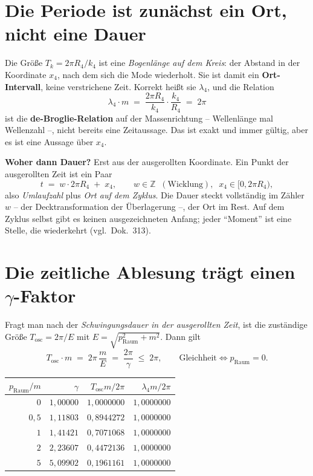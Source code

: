 \section{Die Periode ist zunächst ein Ort, nicht eine Dauer}

Die Größe $T_k = 2\pi R_4/k_4$ ist eine \emph{Bogenlänge auf dem
Kreis}: der Abstand in der Koordinate $x_4$, nach dem sich die Mode
wiederholt. Sie ist damit ein \textbf{Ort-Intervall}, keine
verstrichene Zeit. Korrekt heißt sie $\lambda_4$, und die Relation
\begin{equation}
  \lambda_4 \cdot m \;=\; \frac{2\pi R_4}{k_4}\cdot\frac{k_4}{R_4}
  \;=\; 2\pi
\end{equation}
ist die \textbf{de-Broglie-Relation} auf der Massenrichtung --
Wellenlänge mal Wellenzahl --, nicht bereits eine Zeitaussage.
Das ist exakt und immer gültig, aber es ist eine Aussage über
$x_4$.

\textbf{Woher dann Dauer?} Erst aus der ausgerollten Koordinate.
Ein Punkt der ausgerollten Zeit ist ein Paar
\begin{equation}
  t \;=\; w\cdot 2\pi R_4 \;+\; x_4,
  \qquad w \in \mathbb{Z} \;\;(\text{Wicklung}),\;\;
  x_4 \in [0, 2\pi R_4),
\end{equation}
also \emph{Umlaufzahl} plus \emph{Ort auf dem Zyklus}. Die Dauer
steckt vollständig im Zähler $w$ -- der Decktransformation der
Überlagerung --, der Ort im Rest. Auf dem Zyklus selbst gibt es
keinen ausgezeichneten Anfang; jeder \enquote{Moment} ist eine
Stelle, die wiederkehrt (vgl.\ Dok.~313).

\section{Die zeitliche Ablesung trägt einen \texorpdfstring{$\gamma$}{gamma}-Faktor}

Fragt man nach der \emph{Schwingungsdauer in der ausgerollten
Zeit}, ist die zuständige Größe $T_\text{osc} = 2\pi/E$ mit
$E = \sqrt{p_\text{Raum}^2 + m^2}$. Dann gilt
\begin{equation}
  T_\text{osc}\cdot m \;=\; 2\pi\,\frac{m}{E}
  \;=\; \frac{2\pi}{\gamma}
  \;\le\; 2\pi,
  \qquad\text{Gleichheit} \iff p_\text{Raum} = 0 .
\end{equation}

\begin{center}
\begin{tabular}{rrrr}
\toprule
$p_\text{Raum}/m$ & $\gamma$ & $T_\text{osc}m/2\pi$ &
  $\lambda_4 m/2\pi$ \\
\midrule
$0$   & $1{,}00000$ & $1{,}0000000$ & $1{,}0000000$ \\
$0{,}5$ & $1{,}11803$ & $0{,}8944272$ & $1{,}0000000$ \\
$1$   & $1{,}41421$ & $0{,}7071068$ & $1{,}0000000$ \\
$2$   & $2{,}23607$ & $0{,}4472136$ & $1{,}0000000$ \\
$5$   & $5{,}09902$ & $0{,}1961161$ & $1{,}0000000$ \\
\bottomrule
\end{tabular}
\end{center}

